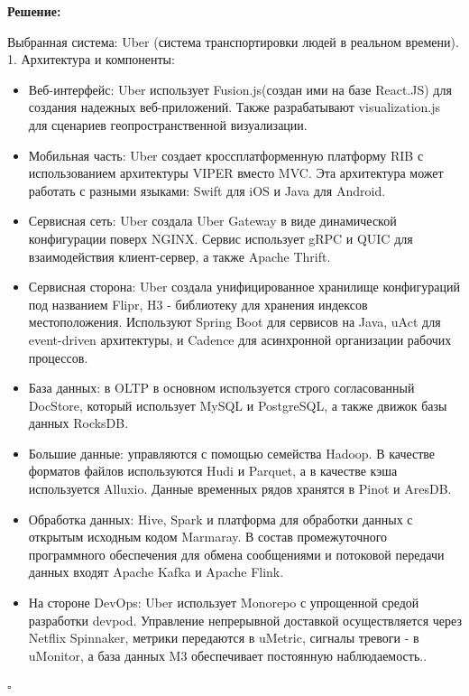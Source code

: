 \documentclass[12pt]{article}
\newenvironment{solution}
{
  \par\textbf{Решение:}\par\bigbreak
  \begingroup
}
{
  \par\bigbreak\hfill$\square$%
  \par\endgroup
}
\begin{document}
\begin{solution}
Выбранная система: Uber (система транспортировки людей в реальном времени).
1. Архитектура и компоненты:
\begin{itemize}
	\item Веб-интерфейс: Uber использует Fusion.js(создан ими на базе React.JS) для создания надежных веб-приложений. Также разрабатывают visualization.js для сценариев геопространственной визуализации.
    \item Мобильная часть: Uber создает кроссплатформенную платформу RIB с использованием архитектуры VIPER вместо MVC. Эта архитектура может работать с разными языками: Swift для iOS и Java для Android.
    \item Сервисная сеть: Uber создала Uber Gateway в виде динамической конфигурации поверх NGINX. Сервис использует gRPC и QUIC для взаимодействия клиент-сервер, а также Apache Thrift.
    \item Сервисная сторона: Uber создала унифицированное хранилище конфигураций под названием Flipr, H3 - библиотеку для хранения индексов местоположения. Используют Spring Boot для сервисов на Java, uAct для event-driven архитектуры, и Cadence для асинхронной организации рабочих процессов.
    \item База данных: в OLTP в основном используется строго согласованный DocStore, который использует MySQL и PostgreSQL, а также движок базы данных RocksDB.
    \item Большие данные: управляются с помощью семейства Hadoop. В качестве форматов файлов используются Hudi и Parquet, а в качестве кэша используется Alluxio. Данные временных рядов хранятся в Pinot и AresDB.
    \item Обработка данных: Hive, Spark и платформа для обработки данных с открытым исходным кодом Marmaray. В состав промежуточного программного обеспечения для обмена сообщениями и потоковой передачи данных входят Apache Kafka и Apache Flink.
    \item На стороне DevOps: Uber использует Monorepo с упрощенной средой разработки devpod. Управление непрерывной доставкой осуществляется через Netflix Spinnaker, метрики передаются в uMetric, сигналы тревоги - в uMonitor, а база данных M3 обеспечивает постоянную наблюдаемость..


\end{itemize}
\end{solution}
\end{document}
